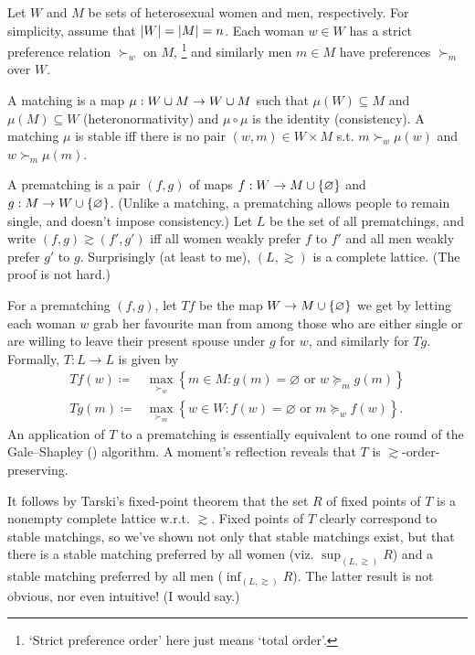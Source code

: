 \documentclass[11pt,letterpaper,reqno,oneside]{article}
\begin{document}
\begin{example}[matching]
	Let $W$ and $M$ be sets of heterosexual women and men, respectively. For simplicity, assume that $\abs*{W}=\abs*{M}=n$. Each woman $w \in W$ has a strict preference relation $\succ_w$ on $M$,%
		\footnote{`Strict preference order' here just means `total order'.}
	and similarly men $m \in M$ have preferences $\succ_m$ over $W$.

	A matching is a map $\mu : W \union M \to W \union M$ such that $\mu(W) \subseteq M$ and $\mu(M) \subseteq W$ (heteronormativity) and $\mu \circ \mu$ is the identity (consistency). A matching $\mu$ is stable iff there is no pair $(w,m) \in W \times M$ s.t. $m \succ_w \mu(w)$ and $w \succ_m \mu(m)$.

	A prematching is a pair $(f,g)$ of maps $f : W \to M \union \{\varnothing\}$ and $g : M \to W \union \{\varnothing\}$. (Unlike a matching, a prematching allows people to remain single, and doesn't impose consistency.) Let $L$ be the set of all prematchings, and write $(f,g) \gtrsim (f',g')$ iff all women weakly prefer $f$ to $f'$ and all men weakly prefer $g'$ to $g$. %
	Surprisingly (at least to me), $(L,\gtrsim)$ is a complete lattice. (The proof is not hard.)

	For a prematching $(f,g)$, let $Tf$ be the map $W \to M \union \{\varnothing\}$ we get by letting each woman $w$ grab her favourite man from among those who are either single or are willing to leave their present spouse under $g$ for $w$, and similarly for $Tg$. Formally, $T : L \to L$ is given by
	\begin{align*}
		Tf(w) \coloneqq{}& \max_{\succ_w} \left\{
		m \in M :
		\text{$g(m) = \varnothing$ or $w \succeq_m g(m)$}
		\right\}
		\\
		Tg(m) \coloneqq{}& \max_{\succ_m} \left\{
		w \in W :
		\text{$f(w) = \varnothing$ or $m \succeq_w f(w)$}
		\right\} .
	\end{align*}
	An application of $T$ to a prematching is essentially equivalent to one round of the Gale--Shapley (\citeyear{GaleShapley1962}) algorithm. A moment's reflection reveals that $T$ is $\gtrsim$-order-preserving.

	It follows by Tarski's fixed-point theorem that the set $R$ of fixed points of $T$ is a nonempty complete lattice w.r.t. $\gtrsim$. Fixed points of $T$ clearly correspond to stable matchings, so we've shown not only that stable matchings exist, but that there is a stable matching preferred by all women (viz. $\sup_{(L,\gtrsim)} R$) and a stable matching preferred by all men ($\inf_{(L,\gtrsim)} R$). The latter result is not obvious, nor even intuitive! (I would say.)


\end{example}
\end{document}
